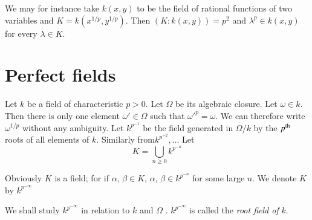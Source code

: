 We may for instance take $k(x, y)$ to be the field of rational
functions of two variables and $K = k (x^{ 1/p} , y^{ 1/p})$. Then $(K
: k(x , y)) = p^2$ and $\lambda^p \in k (x, y)$ for every $\lambda \in
K$.  

\section{Perfect fields}\label{c2:s5} %

Let $k$ be a field of characteristic $p > 0$. Let $\Omega$ be its
algebraic closure. Let $\omega \in k$. Then there is only one element
$\omega' \in \Omega$ such that $\omega'^{p} = \omega$. We can therefore
write $\omega^{ 1/p}$ without any ambiguity. Let $k^{p^{-1}}$ be the
field generated in $\Omega /k$ by the $p^{\rm th}$ roots of all elements of
$k$. Similarly from\pageoriginale $k^{p^{-2}}, \ldots $ Let  
$$
K = \bigcup_{n \geq 0 }k^{ p^{-n}}
$$

Obviously $K$ is a field; for if $\alpha$, $\beta \in K$, $\alpha$,
$\beta \in k^{ p^{-n}}$ for some large $n$. We denote $K$ by $k^{
  p^{-\infty}}$   

We shall study $k^{ p^{-\infty}}$ in relation to $k$ and $\Omega$ . $k^{
  p^{-\infty}}$ is called the \textit{ root field of }$k$.  

